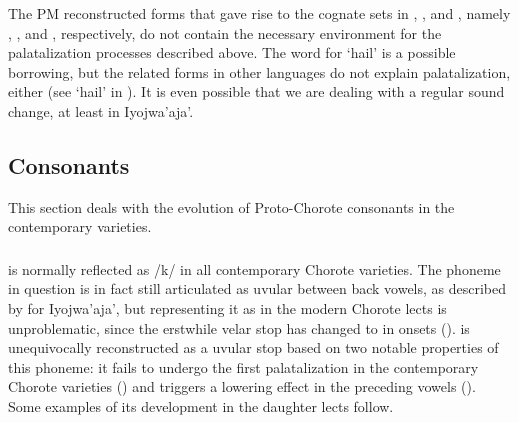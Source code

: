 \begin{exe}
    \ex {}\label{ch-lecherón}
    \ex {}\label{ch-iguana}
    \ex {}\label{ch-granizo}
    \ex {}\label{ch-amarillo}
\end{exe}

The PM reconstructed forms that gave rise to the cognate sets in , , and , namely , , and , respectively, do not contain the necessary environment for the palatalization processes described above. The word for `hail' is a possible borrowing, but the related forms in other languages do not explain palatalization, either (see `hail' in ). It is even possible that we are dealing with a regular sound change, at least in Iyojwa’aja’.

\subsection{Consonants}\label{ch-c}

This section deals with the evolution of Proto-Chorote consonants in the contemporary varieties.

\subsubsection{}\label{ch-q}

 is normally reflected as /k/ in all contemporary Chorote varieties. The phoneme in question is in fact still articulated as uvular between back vowels, as described by \citet[79]{JC14b} for Iyojwa'aja', but representing it as  in the modern Chorote lects is unproblematic, since the erstwhile velar stop  has changed to  in onsets ().  is unequivocally reconstructed as a uvular stop based on two notable properties of this phoneme: it fails to undergo the first palatalization in the contemporary Chorote varieties () and triggers a lowering effect in the preceding vowels (). Some examples of its development in the daughter lects follow.

